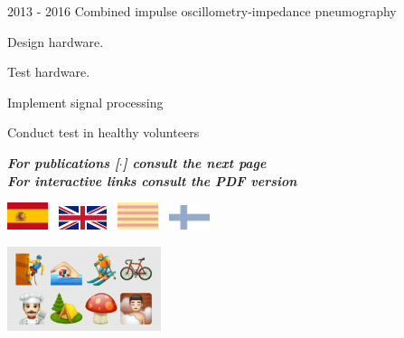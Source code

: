 \documentclass[letterpaper]{twentysecondcv} %
\begin{document}
\begin{RigthPage1}
\begin{twenty}
  
  \twentyitemlist
    	{2013 - 2016}
        {Combined impulse oscillometry-impedance pneumography~\cite{iosj,multi}}
        {}
        {
        \item Design hardware. 
        \item Test hardware. 
        \item Implement signal processing
        \item Conduct test in healthy volunteers
        }       
\end{twenty} 
\begin{flushright}
\textbf{\textit{For publications [$\cdot$] consult the next page}}
\\
\textbf{\textit{For interactive links consult the PDF version}}
\end{flushright}
\end{RigthPage1}


\newpage


\begin{LeftPage2} %
              
\includegraphics[width=1.2cm]{img/esp.png}~
\includegraphics[width=1.4cm]{img/eng.png}~
\includegraphics[width=1.2cm]{img/cat.png}~
\includegraphics[width=1.2cm]{img/fin.png} 
  
\vspace{1cm}     
\begin{center}   
   \includegraphics[width=4.5cm]{img/test.png}
\end{center}

\end{LeftPage2}
\end{document}
